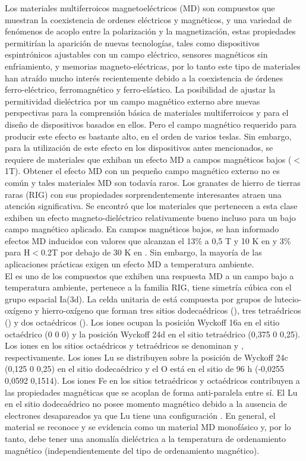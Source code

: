 Los materiales multiferroicos magnetoeléctricos (MD) son compuestos que
muestran la coexistencia de ordenes eléctricos y magnéticos, y una variedad de
fenómenos de acoplo entre la polarización y la magnetización, estas propiedades
permitirían la aparición de nuevas tecnologías, tales como dispositivos
espintrónicos ajustables con un campo eléctrico, sensores magnéticos sin
enfriamiento, y memorias magneto-eléctricas, por lo tanto este tipo de
materiales han atraído mucho interés recientemente debido a la coexistencia de
órdenes ferro-eléctrico, ferromagnético y ferro-elástico. La posibilidad de
ajustar la permitividad dieléctrica por un campo magnético externo abre nuevas
perspectivas para la comprensión básica de materiales multiferroicos y para el
diseño de dispositivos basados en ellos. Pero el campo magnético requerido para
producir este efecto es bastante alto, en el orden de varios teslas. Sin
embargo, para la utilización de este efecto en los dispositivos antes
mencionados, se requiere de materiales que exhiban un efecto MD a campos
magnéticos bajos ($<$1T). Obtener el efecto MD con un pequeño campo magnético
externo no es común y tales materiales MD son todavía raros. Los granates de
hierro de tierras raras (RIG) con sus propiedades sorprendentemente
interesantes atraen una atención significativa. Se encontró que los materiales
que pertenecen a esta clase exhiben un efecto magneto-dieléctrico relativamente
bueno incluso para un bajo campo magnético aplicado. En campos magnéticos
bajos, se han informado efectos MD inducidos con valores que alcanzan el 13\% a
0,5 T y 10 K en  y 3\% para H$<$0.2T por debajo de 30 K en
\cite{Manimuthu2015}. Sin embargo, la mayoría de las aplicaciones
prácticas exigen un efecto MD a temperatura ambiente.\\

El  es uno de los compuestos que exhiben una respuesta MD a un
campo bajo a temperatura ambiente, pertenece a la familia RIG, tiene simetría
cúbica con el grupo espacial Ia(3d). La celda unitaria de  está
compuesta por grupos de lutecio-oxígeno y hierro-oxígeno que forman tres sitios
dodecaédricos (), tres tetraédricos () y dos octaédricos
(). Los iones  ocupan la posición Wyckoff 16a en el sitio
octaédrico (0 0 0) y la posición Wyckoff 24d en el sitio tetraédrico (0,375 0
0,25). Los iones  en los sitios octaédricos y tetraédricos se
denominan  y , respectivamente. Los iones Lu se
distribuyen sobre la posición de Wyckoff 24c (0,125 0 0,25) en el sitio
dodecaédrico y el O está en el sitio de 96 h (-0,0255 0,0592 0,1514). Los iones
Fe en los sitios tetraédricos y octaédricos contribuyen a las propiedades
magnéticas que se acoplan de forma anti-paralela entre sí. El Lu en el sitio
dodecaédrico no posee momento magnético debido a la ausencia de electrones
desapareados ya que Lu tiene una configuración . En general, el
material se reconoce y se evidencia como un material MD monofásico y, por lo
tanto, debe tener una anomalía dieléctrica a la temperatura de ordenamiento
magnético (independientemente del tipo de ordenamiento
magnético)\cite{Manimuthu2014}.

